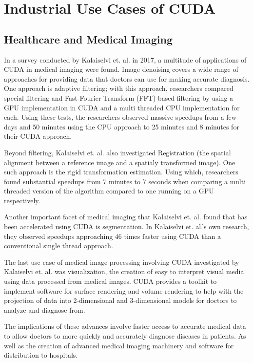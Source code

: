 \documentclass[11pt]{report}
\begin{document}
\section{Industrial Use Cases of CUDA}

    \subsection{Healthcare and Medical Imaging}
    In a survey conducted by Kalaiselvi et. al. in 2017\cite{CUDA_FOR_MEDICAL_IMAGING}, a multitude of applications of CUDA in medical imaging were found. Image denoising covers a wide range of approaches for providing data that doctors can use for making accurate diagnosis. One approach is adaptive filtering; with this approach, researchers compared special filtering and Fast Fourier Transform (FFT) based filtering by using a GPU implementation in CUDA and a multi threaded CPU implementation for each\cite{IMAGE_DENOISING}. Using these tests, the researchers observed massive speedups from a few days and 50 minutes using the CPU approach to 25 minutes and 8 minutes for their CUDA approach. 

    Beyond filtering, Kalaiselvi et. al. also investigated Registration (the spatial alignment between a reference image and a spatialy transformed image). One such approach is the rigid transformation estimation. Using which, researchers found substantial speedups from 7 minutes to 7 seconds when comparing a multi threaded version of the algorithm compared to one running on a GPU respectively\cite{EM_ICP_ON_GPU}.

    Another important facet of medical imaging that Kalaiselvi et. al. found that has been accelerated using CUDA is segmentation. In Kalaiselvi et. al.'s own research, they observed speedups approaching 46 times faster using CUDA than a conventional single thread approach\cite{CPU_AND_GPU_ACCELERATING_IMAGE_APPLICATIONS}.

    The last use case of medical image processing involving CUDA investigated by Kalaiselvi et. al. was visualization, the creation of easy to interpret visual media using data processed from medical images. CUDA provides a toolkit to implement software for surface rendering and volume rendering to help with the projection of data into 2-dimensional and 3-dimensional models for doctors to analyze and diagnose from.

    The implications of these advances involve faster access to accurate medical data to allow doctors to more quickly and accurately diagnose diseases in patients. As well as the creation of advanced medical imaging machinery and software for distribution to hospitals.
    
\end{document}
